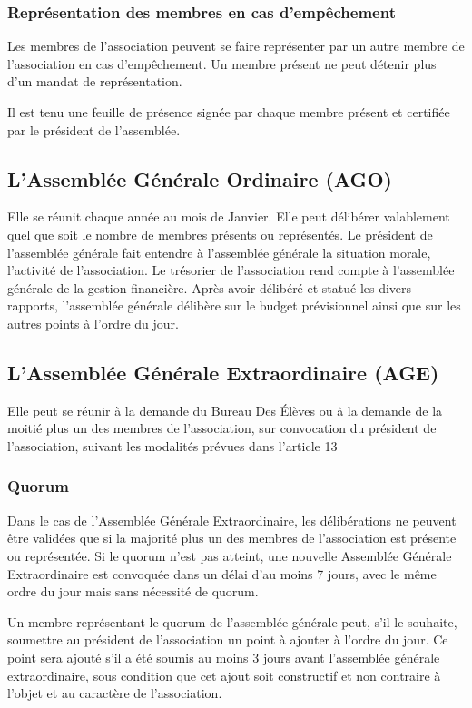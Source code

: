 \documentclass{article} %
\begin{document}
			\subsubsection{Représentation des membres en cas d’empêchement}
				Les membres de l’association peuvent se faire représenter par un
				autre membre de l’association en cas d’empêchement.	Un membre présent
				ne peut détenir plus d’un mandat de représentation.

				Il est tenu une feuille de présence signée par chaque membre présent
				et certifiée par le président de l’assemblée.

		\subsection{L’Assemblée Générale Ordinaire (AGO)}
			Elle se réunit chaque année au mois de Janvier. Elle peut délibérer
			valablement quel que soit le nombre de membres présents ou représentés.
			Le président de l’assemblée générale fait entendre à l’assemblée générale
			la situation morale, l’activité de l’association. Le trésorier de
			l’association rend compte à l’assemblée générale de la gestion
			financière. Après avoir délibéré et statué les divers rapports,
			l’assemblée générale délibère sur le budget prévisionnel ainsi que sur
			les autres points à l’ordre du jour. 

		\subsection{L’Assemblée Générale Extraordinaire (AGE)}
			Elle peut se réunir à la demande du Bureau Des Élèves ou à la demande de
			la moitié plus un des membres de l’association, sur convocation du
			président de l’association, suivant les modalités prévues dans l’article
			13

			\subsubsection{Quorum}
				Dans le cas de l’Assemblée Générale Extraordinaire, les délibérations
				ne peuvent être validées que si la majorité plus un
				des membres de l’association est présente ou représentée. Si le
				quorum n’est pas atteint, une nouvelle Assemblée Générale
				Extraordinaire
				est convoquée dans un délai d’au moins 7 jours, avec le même ordre du
				jour mais sans nécessité de quorum.

				Un membre représentant le quorum de l’assemblée générale peut, s’il
				le souhaite, soumettre au président de l’association un point à
				ajouter
				à l’ordre du jour. Ce point sera ajouté s’il a été soumis au moins 3
				jours avant l’assemblée générale extraordinaire, sous condition que
				cet
				ajout soit constructif et non contraire à l'objet et au caractère de
				l’association.
\end{document}
